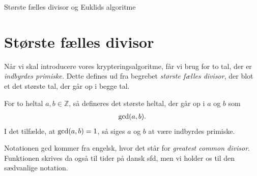\begin{center}
	\Huge
	Største fælles divisor og Euklids algoritme
\end{center}


\section*{Største fælles divisor}

Når vi skal introducere vores krypteringsalgoritme, får vi brug for to tal, der er \textit{indbyrdes primiske.} Dette defines ud fra begrebet \textit{største fælles divisor}, der blot et det største tal, der går op i begge tal. 
\begin{defn}
	For to heltal $a,b\in \mathbb{Z}$, så defineres det største heltal, der går op i $a$ og $b$ som
	\begin{align*}
		\textnormal{gcd}(a,b).
	\end{align*}
	I det tilfælde, at $\textnormal{gcd}(a,b)=1$, så siges $a$ og $b$ at være indbyrdes primiske. 
\end{defn}
Notationen gcd kommer fra engelsk, hvor det står for \textit{greatest common divisor}. Funktionen skrives da også til tider på dansk sfd, men vi holder os til den sædvanlige notation. 

